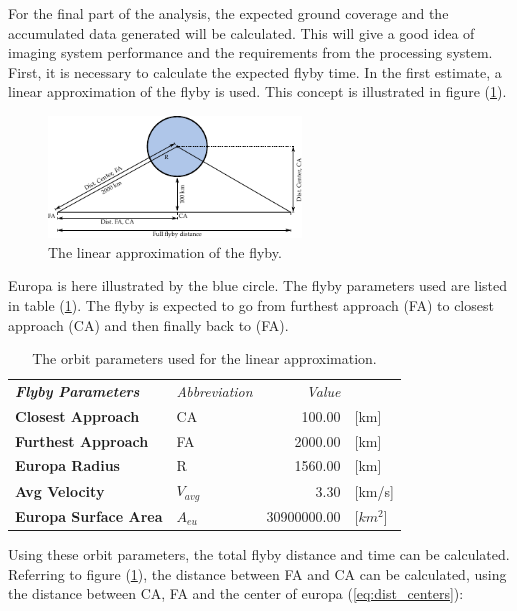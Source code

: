 For the final part of the analysis, the expected ground coverage and the accumulated data generated will be calculated. This will give a good idea of imaging system performance and the requirements from the processing system. First, it is necessary to calculate the expected flyby time. In the first estimate, a linear approximation of the flyby is used. This concept is illustrated in figure (\ref{fig:linear_flyby}). 
\begin{figure}[h!]
\centering
\includegraphics[width=0.6\textwidth]{figures/Orbiter/linear_flyby.pdf}
\caption{The linear approximation of the flyby.}
\label{fig:linear_flyby}
\end{figure}
Europa is here illustrated by the blue circle. The flyby parameters used are listed in table (\ref{tab:orbit_parameters_linear}). %
The flyby is expected to go from furthest approach (FA) to closest approach (CA) and then finally back to (FA).
\begin{table}[h!]
  \centering
    \begin{tabular}{l|l|r|l}
\textit{\textbf{Flyby Parameters}} & \textit{Abbreviation} & \multicolumn{1}{r}{\textit{Value}} &  \bigstrut[b]\\
\cline{1-3}\textbf{Closest Approach} & CA    & 100.00 & [km] \bigstrut[t]\\
\textbf{Furthest Approach} & FA    & 2000.00 & [km] \\
\textbf{Europa Radius} & R     & 1560.00 & [km] \\
\textbf{Avg Velocity} & $V_{avg}$ & 3.30  & [km/s] \\
\textbf{Europa Surface Area} & $A_{eu}$ & 30900000.00 & [$km^2$] \\
\end{tabular}%
    \caption{The orbit parameters used for the linear approximation.}
  \label{tab:orbit_parameters_linear}%
\end{table}%
Using these orbit parameters, the total flyby distance and time can be calculated. Referring to figure (\ref{fig:linear_flyby}), the distance between FA and CA can be calculated, using the distance between CA, FA and the center of europa (\ref{eq:dist_centers}):
